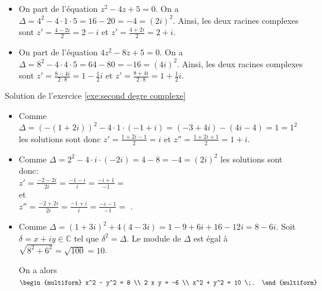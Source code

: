 \begin{corrige}
\begin{sol}
\begin{itemize}
			Ainsi, les deux racines complexes sont $z' = \frac{2-4i}{2} = 1 - 2i$ et $z' = \frac{2+4i}{2} = 1 + 2i$. 
		\item On part de l'\'equation $z^2 - 4 z + 5 = 0$. 
			On a $\Delta = 4^2 - 4 \cdot 1 \cdot 5 = 16 - 20 = -4 = (2i)^2$.
			Ainsi, les deux racines complexes sont $z' = \frac{4-2i}{2} = 2 - i$ et $z' = \frac{4+2i}{2} = 2 + i$. 
		\item On part de l'\'equation $4 z^2 - 8 z + 5 = 0$. 
			On a $\Delta = 8^2 - 4 \cdot 4 \cdot 5 = 64 - 80 = -16 = (4i)^2$.
			Ainsi, les deux racines complexes sont 
			$z' = \frac{8-4i}{2 \cdot 8} = 1 - \frac{1}{2} i$ et $z' = \frac{8+4i}{2 \cdot 8} = 1 + \frac{1}{2} i$. 
	\end{itemize}
\end{sol}
\begin{sol}
\label{sol:second degre complexe}
Solution de l'exercice \ref{exe:second degre complexe} \\
\begin{itemize} 
\item Comme $\Delta = (- (1 + 2 i) )^2 - 4 \cdot 1 \cdot (-1+i) = (-3+4i)-(4i-4) = 1 = 1^2$
      les solutions sont donc $z' = \frac{1+2i-1}{2} = i$ et $z'' = \frac{1+2i+1}{2} = 1+i$.
\item Comme $\Delta = 2^2 - 4 \cdot i \cdot (-2i) = 4-8 = -4 = (2i)^2$
      les solutions sont donc: \\
      $z' = \frac{-2-2i}{2i} = \frac{-1-i}{i} = \frac{-i+1}{-1} = $ 
      \\ et \\
      $z'' = \frac{-2+2i}{2i} = \frac{-1+i}{i} = \frac{-i-1}{-1} = $ .
\item Comme $\Delta = (1+3i)^2 + 4 (4 - 3i) = 1-9 + 6i + 16 - 12i = 8 - 6i$. 
      Soit $\delta = x + i y \in \mathbb{C}$ tel que $\delta^2 = \Delta$.
      Le module de $\Delta$ est \'egal \`a $\sqrt{8^2 + 6^2} = \sqrt{100} = 10$.
      
      On a alors 
      $\displaystyle{
	      \begin{multiform} 
		      x^2 - y^2 = 8       \\
		      2 x y     = -6      \\
		      x^2 + y^2 = 10      \;.
	      \end{multiform}
      }$
      

\end{itemize}
\end{sol}
\end{corrige}
